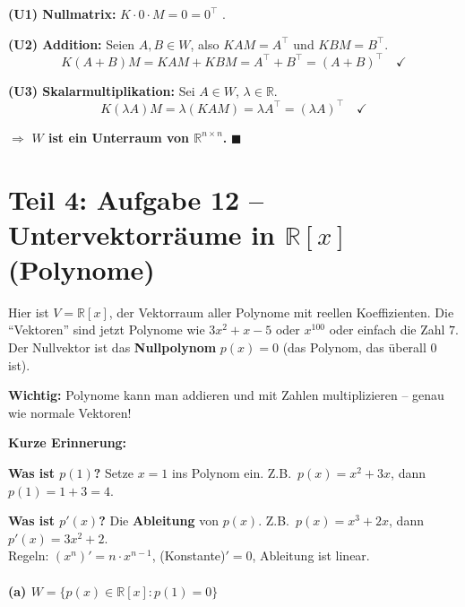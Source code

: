 \documentclass[a4paper,12pt]{article}
\begin{document}
\textbf{(U1) Nullmatrix:} $K \cdot 0 \cdot M = 0 = 0^\top$ \checkmark.

\textbf{(U2) Addition:} Seien $A, B \in W$, also $KAM = A^\top$ und $KBM = B^\top$.
\[
K(A+B)M = KAM + KBM = A^\top + B^\top = (A+B)^\top \quad \checkmark
\]

\textbf{(U3) Skalarmultiplikation:} Sei $A \in W$, $\lambda \in \mathbb{R}$.
\[
K(\lambda A)M = \lambda (KAM) = \lambda A^\top = (\lambda A)^\top \quad \checkmark
\]

$\Rightarrow$ \textbf{$W$ ist ein Unterraum von $\mathbb{R}^{n \times n}$.} \hfill $\blacksquare$

\newpage

\part*{Teil 4: Aufgabe 12 -- Untervektorr\"aume in $\mathbb{R}[x]$ (Polynome)}

Hier ist $V = \mathbb{R}[x]$, der Vektorraum aller Polynome mit reellen Koeffizienten. Die ``Vektoren'' sind jetzt Polynome wie $3x^2 + x - 5$ oder $x^{100}$ oder einfach die Zahl $7$. Der Nullvektor ist das \textbf{Nullpolynom} $p(x) = 0$ (das Polynom, das \"uberall $0$ ist).

\textbf{Wichtig:} Polynome kann man addieren und mit Zahlen multiplizieren -- genau wie normale Vektoren!

\textbf{Kurze Erinnerung:}

\begin{merkbox}[title={Polynome -- Basics}]
\textbf{Was ist $p(1)$?} Setze $x = 1$ ins Polynom ein. Z.B.\ $p(x) = x^2 + 3x$, dann $p(1) = 1 + 3 = 4$.

\medskip
\textbf{Was ist $p'(x)$?} Die \textbf{Ableitung} von $p(x)$. Z.B.\ $p(x) = x^3 + 2x$, dann $p'(x) = 3x^2 + 2$.\\
Regeln: $(x^n)' = n \cdot x^{n-1}$, (Konstante)$' = 0$, Ableitung ist linear.
\end{merkbox}

\subsection*{(a) \quad $W = \{p(x) \in \mathbb{R}[x] : p(1) = 0\}$}
\end{document}
